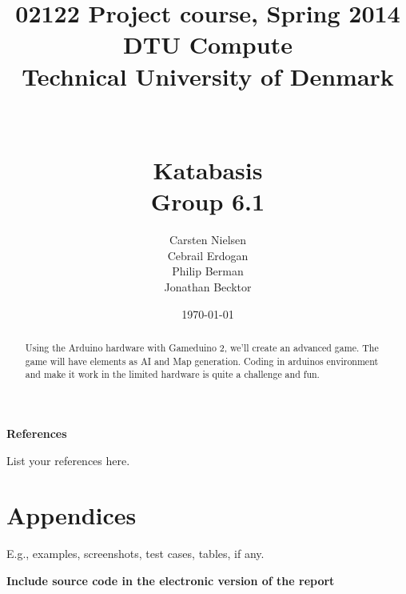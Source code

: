 \documentclass[12pt]{report}
\title{02122 Project course, Spring 2014 \\
DTU Compute \\
Technical University of Denmark \\~\\~\\ Katabasis \\ Group 6.1}
\author{Carsten Nielsen  \\
        Cebrail Erdogan \\
        Philip Berman   \\
        Jonathan Becktor\\  }
\date{\today}
\begin{document}
\maketitle

\begin{abstract}
Using the Arduino hardware with Gameduino 2, we’ll create an advanced game.
The game will have elements as AI and Map generation.
Coding in arduinos environment and make it work in the
limited hardware is quite a challenge and fun.
\end{abstract}


\tableofcontents

\newpage



\newpage















\newpage

\textbf{References}

List your references here.

\newpage


\chapter{Appendices}

 E.g., examples, screenshots, test cases, tables, if any.

\textbf{Include source code in the electronic version of the report}
\end{document}
